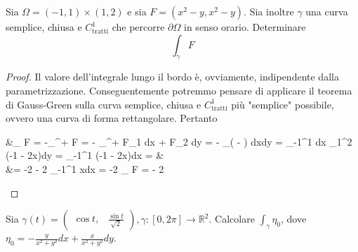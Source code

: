 \begin{example}
	Sia $\Omega = (-1, 1) \times (1, 2)$ e sia $F=(x^2 - y, x^2 - y)$. Sia inoltre $\gamma$ una curva semplice, chiusa e $C^1_\text{tratti}$ che percorre $\partial \Omega$ in senso orario. Determinare
	$$
	\int_\gamma F
	$$
\end{example}
\begin{proof}
	Il valore dell'integrale lungo il bordo è, ovviamente, indipendente dalla parametrizzazione. Conseguentemente potremmo pensare di applicare il teorema di Gauss-Green sulla curva semplice, chiusa e $C^1_\text{tratti}$ più "semplice" possibile, ovvero una curva di forma rettangolare.
	Pertanto
	\begin{flalign*}
	&\int_{\gamma} F = -\int_{\partial^{+} \Omega} F = - \int_{\partial^{+} \Omega} F_1 dx + F_2 dy = - \int_\Omega \left(  -  \right) dxdy = \int_{-1}^{1} dx \int_1^2 (-1 - 2x)dy = \int_{-1}^{1} (-1 - 2x)dx = & \\ 
	&= -2 - 2 \int_{-1}^1 xdx = -2 \implies \int_{\gamma} F = - 2
	\end{flalign*}
\end{proof}
\begin{example}
	Sia $\gamma(t) = \begin{pmatrix} \cos{t}, & \frac{\sin{t}}{\sqrt{2}} \end{pmatrix}, \gamma: [0, 2\pi] \to \mathbb{R}^2$. Calcolare $\int_\gamma \eta_0$, dove $\eta_0 = - \frac{y}{x^2 + y^2}dx + \frac{x}{x^2 + y^2}dy$.
\end{example}
